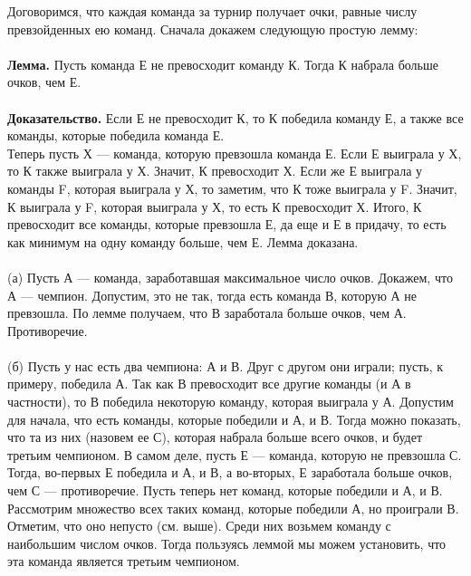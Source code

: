 \documentclass{article}
\begin{document}
Договоримся, что каждая команда за турнир получает очки, равные числу превзойденных ею команд. Сначала докажем следующую простую лемму:\\\\
\textbf{Лемма.} Пусть команда Е не превосходит команду К. Тогда К набрала больше очков, чем Е.\\\\
\textbf{Доказательство.} Если Е не превосходит К, то К победила команду Е, а также все команды, которые победила команда Е.\\
Теперь пусть Х --- команда, которую превзошла команда Е. Если Е выиграла у Х, то К также выиграла у Х. Значит, К превосходит Х. Если же Е выиграла у команды F, которая выиграла у Х, то заметим, что К тоже выиграла у F. Значит, К выиграла у F, которая выиграла у Х, то есть К превосходит Х. Итого, К превосходит все команды, которые превзошла Е, да еще и Е в придачу, то есть как минимум на одну команду больше, чем Е. Лемма доказана.\\\\
(а) Пусть А --- команда, заработавшая максимальное число очков. Докажем, что А --- чемпион. Допустим, это не так, тогда есть команда В, которую А не превзошла. По лемме получаем, что В заработала больше очков, чем А. Противоречие.\\\\
(б) Пусть у нас есть два чемпиона: А и В. Друг с другом они играли; пусть, к примеру, победила А. Так как В превосходит все другие команды (и А в частности), то В победила некоторую команду, которая выиграла у А. Допустим для начала, что есть команды, которые победили и А, и В. Тогда можно показать, что та из них (назовем ее С), которая набрала больше всего очков, и будет третьим чемпионом. В самом деле, пусть Е --- команда, которую не превзошла С. Тогда, во-первых Е победила и А, и В, а во-вторых, Е заработала больше очков, чем С --- противоречие. Пусть теперь нет команд, которые победили и А, и В. Рассмотрим множество всех таких команд, которые победили А, но проиграли В. Отметим, что оно непусто (см. выше). Среди них возьмем команду с наибольшим числом очков. Тогда пользуясь леммой мы можем установить, что эта команда является третьим чемпионом. 
\end{document}
